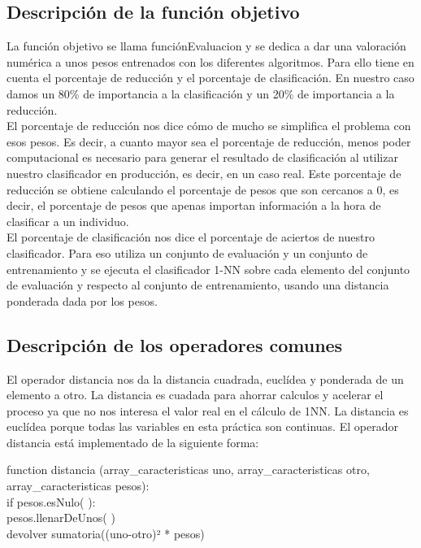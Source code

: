 \documentclass[12pt, spanish]{article}
\newcommand\tab[1][1cm]{\hspace*{#1}}
\begin{document}
\subsection{Descripción de la función objetivo }
La función objetivo se llama funciónEvaluacion y se dedica a dar una valoración numérica a unos pesos entrenados con los diferentes algoritmos. Para ello tiene en cuenta el porcentaje de reducción y el porcentaje de clasificación. En nuestro caso damos un 80\% de importancia a la clasificación y un 20\% de importancia a la reducción. \\
\newline
El porcentaje de reducción nos dice cómo de mucho se simplifica el problema con esos pesos. Es decir, a cuanto mayor sea el porcentaje de reducción, menos poder computacional es necesario para generar el resultado de clasificación al utilizar nuestro clasificador en producción, es decir, en un caso real. Este porcentaje de reducción se obtiene calculando el porcentaje de pesos que son cercanos a 0, es decir, el porcentaje de pesos que apenas importan información a la hora de clasificar a un individuo. \\
\newline
El porcentaje de clasificación nos dice el porcentaje de aciertos de nuestro clasificador. Para eso utiliza un conjunto de evaluación y un conjunto de entrenamiento y se ejecuta el clasificador 1-NN sobre cada elemento del conjunto de evaluación y respecto al conjunto de entrenamiento, usando una distancia ponderada dada por los pesos. 

\subsection{Descripción de los operadores comunes}
El operador distancia nos da la distancia cuadrada, euclídea y ponderada de un elemento a otro. La distancia es cuadada para ahorrar calculos y acelerar el proceso ya que no nos interesa el valor real en el cálculo de 1NN. La distancia es euclídea porque todas las variables en esta práctica son continuas. 
El operador distancia está implementado de la siguiente forma: 

function distancia (array\_caracteristicas uno, array\_caracteristicas otro, array\_caracteristicas pesos): \\ 
\tab    if pesos.esNulo( ):\\ 
\tab\tab 	    pesos.llenarDeUnos( )\\
devolver sumatoria((uno-otro)² * pesos)\\
\end{document}
